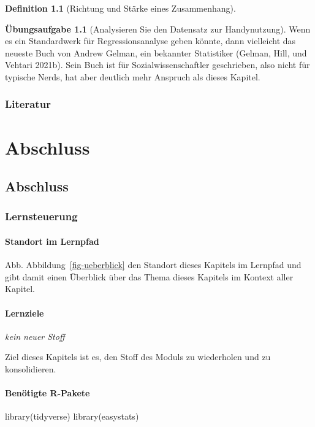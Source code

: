 \documentclass[
  a4paper,
  DIV=11]{scrreprt}
\newenvironment{Shaded}{\begin{snugshade}}{\end{snugshade}}
\newcommand{\FunctionTok}[1]{\textcolor[rgb]{0.28,0.35,0.67}{#1}}
\newcommand{\NormalTok}[1]{\textcolor[rgb]{0.00,0.23,0.31}{#1}}
\theoremstyle{definition}
\newtheorem{exercise}{Übungsaufgabe}[chapter]
\theoremstyle{definition}
\theoremstyle{definition}
\newtheorem{definition}{Definition}[chapter]
\theoremstyle{remark}
\begin{document}
\begin{definition}[Richtung und Stärke eines
Zusammenhang]
\begin{exercise}[Analysieren Sie den Datensatz zur
Handynutzung]
Wenn es ein Standardwerk für Regressionsanalyse geben könnte, dann
vielleicht das neueste Buch von Andrew Gelman, ein bekannter Statistiker
(Gelman, Hill, und Vehtari 2021b). Sein Buch ist für
Sozialwissenschaftler geschrieben, also nicht für typische Nerds, hat
aber deutlich mehr Anspruch als dieses Kapitel.

\section{Literatur}\label{literatur-8}

\part{Abschluss}

\chapter{Abschluss}\label{abschluss-1}

\section{Lernsteuerung}\label{lernsteuerung-9}

\subsection{Standort im Lernpfad}\label{standort-im-lernpfad-9}

Abb. Abbildung~\ref{fig-ueberblick} den Standort dieses Kapitels im
Lernpfad und gibt damit einen Überblick über das Thema dieses Kapitels
im Kontext aller Kapitel.

\subsection{Lernziele}\label{lernziele-10}

\emph{kein neuer Stoff}

Ziel dieses Kapitels ist es, den Stoff des Moduls zu wiederholen und zu
konsolidieren.

\subsection{Benötigte R-Pakete}\label{benuxf6tigte-r-pakete-9}

\begin{Shaded}
\begin{Highlighting}[]
\FunctionTok{library}\NormalTok{(tidyverse)}
\FunctionTok{library}\NormalTok{(easystats)}
\end{Highlighting}
\end{Shaded}


\end{exercise}
\end{definition}
\end{document}

